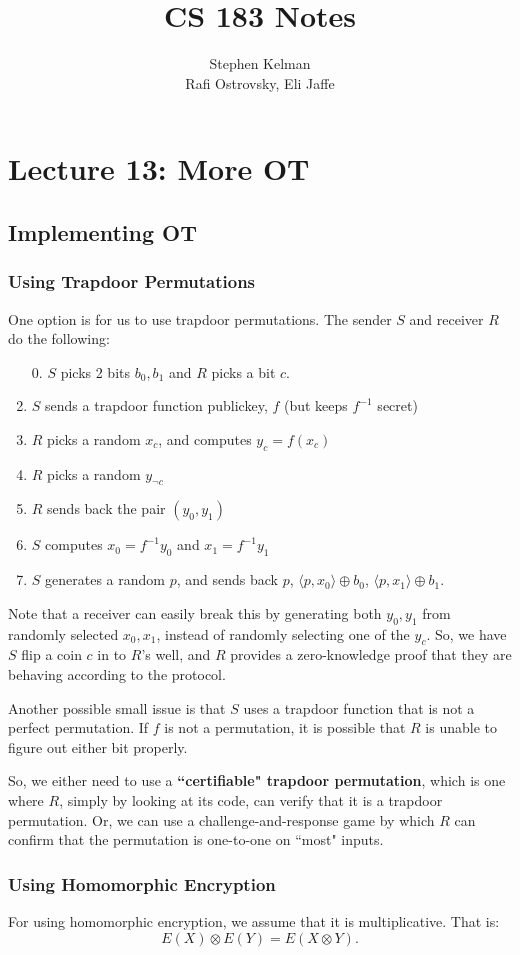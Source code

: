 \documentclass[11pt]{article}
\title{CS 183 Notes}
\author{Stephen Kelman\\ Rafi Ostrovsky, Eli Jaffe}
\begin{document}
\section{Lecture 13: More OT}

\subsection{Implementing OT}
\subsubsection{Using Trapdoor Permutations}
One option is for us to use trapdoor permutations.
The sender \(S\) and receiver \(R\) do the following:
\begin{enumerate}
\item [0.] \(S\) picks 2 bits \(b_0,b_1\) and \(R\) picks a bit \(c\).
\item \(S\) sends a trapdoor function publickey, \(f\) (but keeps \(f^{-1}\) secret)
\item \(R\) picks a random \(x_c\), and computes \(y_c = f(x_c)\)
\item \(R\) picks a random \(y_{\neg c}\)
\item \(R\) sends back the pair \((y_0,y_1)\)
\item \(S\) computes \(x_0 = f^{-1}y_0\) and \(x_1=f^{-1}y_1\)
\item \(S\) generates a random \(p\), and sends back \(p\), \(\langle p,x_0\rangle\oplus b_0\), \(\langle p, x_1\rangle\oplus b_1\).
\end{enumerate}
Note that a receiver can easily break this by generating both \(y_0,y_1\) from randomly selected \(x_0,x_1\),
instead of randomly selecting one of the \(y_c\).
So, we have \(S\) flip a coin \(c\) in to \(R\)'s well,
and \(R\) provides a zero-knowledge proof that they are behaving according to the protocol.\smallskip

Another possible small issue is that \(S\) uses a trapdoor function that is not a perfect permutation.
If \(f\) is not a permutation, it is possible that \(R\) is unable to figure out either bit properly.

So, we either need to use a \textbf{``certifiable" trapdoor permutation},
which is one where \(R\), simply by looking at its code, can verify that it is a trapdoor permutation.
Or, we can use a challenge-and-response game by which \(R\) can confirm that the permutation is one-to-one on ``most" inputs.

\subsubsection{Using Homomorphic Encryption}
For using homomorphic encryption, we assume that it is multiplicative. 
That is:
\[E(X)\otimes E(Y) = E(X\otimes Y).\]
\end{document}
